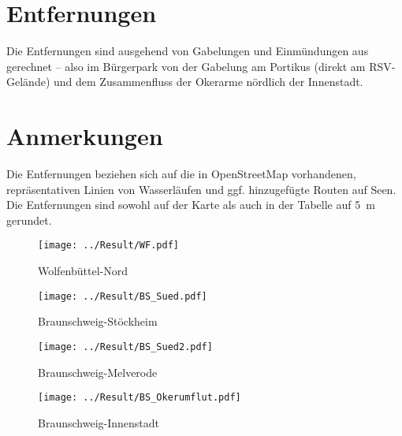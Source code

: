 \documentclass{article}
\begin{document}
    \section*{Entfernungen} Die Entfernungen sind ausgehend von Gabelungen und
    Einmündungen aus gerechnet -- also im Bürgerpark von der Gabelung am
    Portikus (direkt am RSV-Gelände) und dem Zusammenfluss der Okerarme nördlich
    der Innenstadt. \\
    \begin{center}
    \end{center}
    
    \section*{Anmerkungen}
    Die Entfernungen beziehen sich auf die in OpenStreetMap vorhandenen,
    repräsentativen Linien von Wasserläufen und ggf. hinzugefügte Routen auf
    Seen. Die Entfernungen sind sowohl auf der Karte als auch in der Tabelle auf 5~m gerundet.    
    
    \listoffigures
    
    \begin{figure}[!h]
        \centering
        \texttt{[image: ../Result/WF.pdf]}
        \caption{Wolfenbüttel-Nord}
        \label{fig:map_WF}
    \end{figure}
    \newpage
    
    \begin{figure}[!h]
        \centering
        \texttt{[image: ../Result/BS\_Sued.pdf]}
        \caption{Braunschweig-Stöckheim}
        \label{fig:map_BS1}
    \end{figure}
    \newpage
    
    \begin{figure}[!h]
        \centering
        \texttt{[image: ../Result/BS\_Sued2.pdf]}
        \caption{Braunschweig-Melverode}
        \label{fig:map_BS2}
    \end{figure}
    \newpage
    
    \begin{figure}[!h]
        \centering
        \texttt{[image: ../Result/BS\_Okerumflut.pdf]}
        \caption{Braunschweig-Innenstadt}
        \label{fig:map_BS3}
    \end{figure}
    \newpage
    
\end{document}
